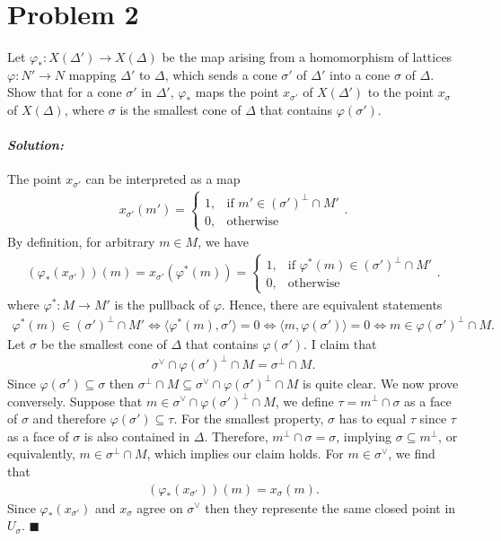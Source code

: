 \documentclass[12pt, a4paper]{article}
\newenvironment{solution}
  {\paragraph{\textit{Solution:}}\par\medskip}
  {\hfill$\blacksquare$\vspace{0.1cm}}
\begin{document}
\section*{Problem 2}
Let $\varphi_* : X(\Delta') \to X(\Delta)$ be the map arising from a homomorphism of lattices $\varphi : N' \to N$ mapping $\Delta'$ to $\Delta$, which sends a cone $\sigma'$ of $\Delta'$ into a cone $\sigma$ of $\Delta$. Show that for a cone $\sigma'$ in $\Delta'$, $\varphi_*$ maps the point $x_{\sigma'}$ of $X(\Delta')$ to the point $x_\sigma$ of $X(\Delta)$, where $\sigma$ is the smallest cone of $\Delta$ that contains $\varphi(\sigma')$.
\begin{solution}
    The point $x_{\sigma'}$ can be interpreted as a map
    \begin{align*}
        x_{\sigma'}(m') = \begin{cases} 1, & \text{if } m' \in (\sigma')^\perp \cap M' \\ 0, & \text{otherwise} \end{cases}.
    \end{align*}
    By definition, for arbitrary $m\in M$, we have 
    \begin{align*}
        (\varphi_*(x_{\sigma'}))(m) = x_{\sigma'}(\varphi^*(m))= \begin{cases} 1, & \text{if } \varphi^*(m) \in (\sigma')^\perp \cap M' \\ 0, & \text{otherwise} \end{cases}.
    \end{align*}
    where $\varphi^*:M\to M'$ is the pullback of $\varphi$. Hence, there are equivalent statements
    \begin{align*}
        \varphi^*(m) \in (\sigma')^\perp \cap M' 
        \Longleftrightarrow \langle\varphi^*(m),\sigma'\rangle = 0
        \Longleftrightarrow \langle m,\varphi(\sigma')\rangle = 0
        \Longleftrightarrow m\in \varphi(\sigma')^\perp\cap M.
    \end{align*}
    Let $\sigma$ be the smallest cone of $\Delta$ that contains $\varphi(\sigma')$. I claim that
    \begin{align*}
        \sigma^\vee\cap \varphi(\sigma')^\perp\cap M = \sigma^\perp \cap M.
    \end{align*}
    Since $\varphi(\sigma')\subseteq \sigma $ then $\sigma^\perp \cap M\subseteq \sigma^\vee\cap\varphi(\sigma')^\perp\cap M$ is quite clear. We now prove conversely.
    Suppose that $m\in \sigma^\vee\cap \varphi(\sigma')^\perp\cap M$, we define $\tau=m^\perp \cap \sigma$ as a face of $\sigma$ and therefore $\varphi(\sigma')\subseteq \tau$. For the smallest property, $\sigma$ has to equal $\tau$ 
    since $\tau$ as a face of $\sigma$ is also contained in $\Delta$. Therefore, $m^\perp \cap \sigma = \sigma$, implying $\sigma \subseteq m^\perp$, or equivalently, $m \in \sigma^\perp \cap M$, which implies our claim holds.
    For $m\in \sigma^\vee$, we find that 
    \begin{align*}
        (\varphi_*(x_{\sigma'}))(m) = x_{\sigma}(m).
    \end{align*}
    Since $\varphi_*(x_{\sigma'})$ and $x_{\sigma}$ agree on $\sigma^\vee$ then they represente the same closed point in $U_\sigma$.
\end{solution}
\end{document}
